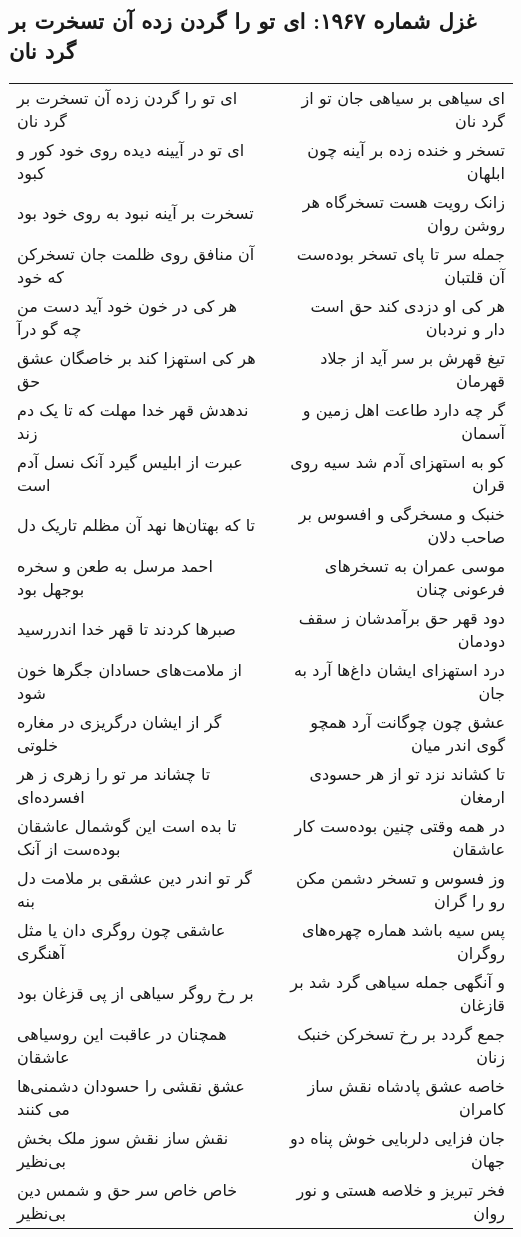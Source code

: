 \begin{center}
\section*{غزل شماره ۱۹۶۷: ای تو را گردن زده آن تسخرت بر گرد نان}
\label{sec:1967}
\begin{longtable}{l p{0.5cm} r}
ای تو را گردن زده آن تسخرت بر گرد نان
&&
ای سیاهی بر سیاهی جان تو از گرد نان
\\
ای تو در آیینه دیده روی خود کور و کبود
&&
تسخر و خنده زده بر آینه چون ابلهان
\\
تسخرت بر آینه نبود به روی خود بود
&&
زانک رویت هست تسخرگاه هر روشن روان
\\
آن منافق روی ظلمت جان تسخرکن که خود
&&
جمله سر تا پای تسخر بوده‌ست آن قلتبان
\\
هر کی در خون خود آید دست من چه گو درآ
&&
هر کی او دزدی کند حق است دار و نردبان
\\
هر کی استهزا کند بر خاصگان عشق حق
&&
تیغ قهرش بر سر آید از جلاد قهرمان
\\
ندهدش قهر خدا مهلت که تا یک دم زند
&&
گر چه دارد طاعت اهل زمین و آسمان
\\
عبرت از ابلیس گیرد آنک نسل آدم است
&&
کو به استهزای آدم شد سیه روی قران
\\
تا که بهتان‌ها نهد آن مظلم تاریک دل
&&
خنبک و مسخرگی و افسوس بر صاحب دلان
\\
احمد مرسل به طعن و سخره بوجهل بود
&&
موسی عمران به تسخرهای فرعونی چنان
\\
صبرها کردند تا قهر خدا اندررسید
&&
دود قهر حق برآمدشان ز سقف دودمان
\\
از ملامت‌های حسادان جگرها خون شود
&&
درد استهزای ایشان داغ‌ها آرد به جان
\\
گر از ایشان درگریزی در مغاره خلوتی
&&
عشق چون چوگانت آرد همچو گوی اندر میان
\\
تا چشاند مر تو را زهری ز هر افسرده‌ای
&&
تا کشاند نزد تو از هر حسودی ارمغان
\\
تا بده است این گوشمال عاشقان بوده‌ست از آنک
&&
در همه وقتی چنین بوده‌ست کار عاشقان
\\
گر تو اندر دین عشقی بر ملامت دل بنه
&&
وز فسوس و تسخر دشمن مکن رو را گران
\\
عاشقی چون روگری دان یا مثل آهنگری
&&
پس سیه باشد هماره چهره‌های روگران
\\
بر رخ روگر سیاهی از پی قزغان بود
&&
و آنگهی جمله سیاهی گرد شد بر قازغان
\\
همچنان در عاقبت این روسیاهی عاشقان
&&
جمع گردد بر رخ تسخرکن خنبک زنان
\\
عشق نقشی را حسودان دشمنی‌ها می کنند
&&
خاصه عشق پادشاه نقش ساز کامران
\\
نقش ساز نقش سوز ملک بخش بی‌نظیر
&&
جان فزایی دلربایی خوش پناه دو جهان
\\
خاص خاص سر حق و شمس دین بی‌نظیر
&&
فخر تبریز و خلاصه هستی و نور روان
\\
\end{longtable}
\end{center}
